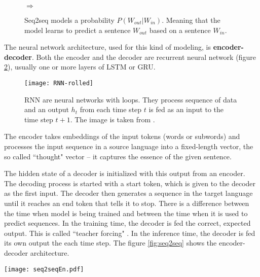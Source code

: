 \documentclass{ExcelAtFIT}
\begin{document}
\begin{figure}[h!]
    \begin{center}
        \setlength{\fboxsep}{8pt}
        $\Longrightarrow$
    \end{center}
	\caption{Seq2seq models a probability $P(W_{out}|W_{in})$. Meaning that the model learns to predict a sentence $W_{out}$ based on a sentence $W_{in}$.}
	\label{fig:seqProbability}
\end{figure}

The neural network architecture, used for this kind of modeling, is \textbf{encoder-decoder}. Both the encoder and the decoder are recurrent neural network (figure \ref{fig:rnn}), usually one or more layers of LSTM or GRU.

\begin{figure}[h!]\centering
  \centering
  \texttt{[image: RNN-rolled]}
  \caption{RNN are neural networks with loops. They process sequence of data and an output $h_t$ from each time step $t$ is fed as an input to the time step $t+1$. The image is taken from \cite{understandingLSTM}.}
  \label{fig:rnn}
\end{figure}


The encoder takes embeddings of the input tokens (words or subwords) and processes the input sequence in a source language into a fixed-length vector, the so called ``thought" vector -- it captures the essence of the given sentence.

The hidden state of a decoder is initialized with this output from an encoder. The decoding process is started with a start token, which is given to the decoder as the first input. The decoder then generates a sequence in the target language until it reaches an end token that tells it to stop. There is a difference between the time when model is being trained and between the time when it is used to predict sequences. In the training time, the decoder is fed the correct, expected output. This is called ``teacher forcing" \cite{teacherForcing}. In the inference time, the decoder is fed its own output the each time step. The figure \ref{fig:seq2seq} shows the encoder-decoder architecture.

\begin{figure*}[h!]\centering %
  \centering
  \texttt{[image: seq2seqEn.pdf]}\\[1pt]
  \caption{The encoder-decoder architecture shown on translation from a Czech sentence to its English equivalent. The encoder processes embeddings of the input sequence and produces the fixed-length ``thought" vector. This vector is used as initial state of the decoder, it tells it from what context should it produce the output in the target language. The prediction is started with the $\langle s \rangle$ starting token. Then the decoder is fed either correct output tokens during the training time or its own output, from the time $t - 1$, during inference time, until it generates the ending $\langle /s \rangle$ token.}
  \label{fig:seq2seq}
\end{figure*}
\end{document}
